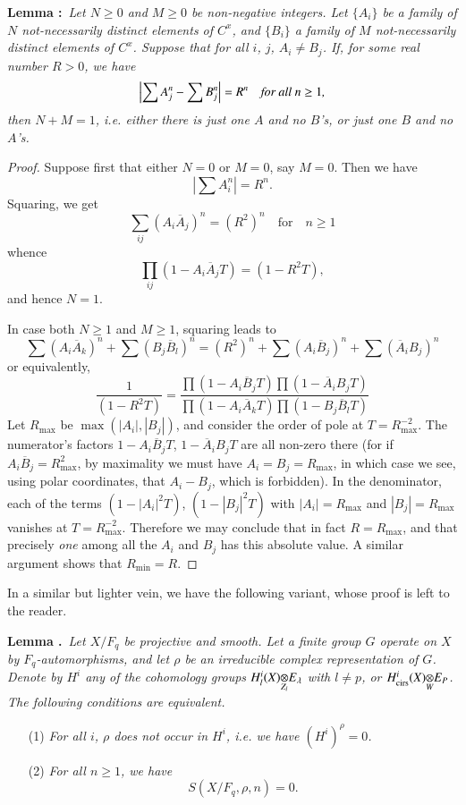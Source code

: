 \medskip
\noindent
{\bfseries Lemma :\label{art6-lem1.2}}~{\em Let $N\geq 0$ and $M\geq 0$ be non-negative integers. Let $\{A_{i}\}$ be a family of $N$ not-necessarily distinct elements of $C^{x}$, and $\{B_{i}\}$ a family of $M$ not-necessarily distinct elements of $C^{x}$. Suppose that for all $i$, $j$, $A_{i}\neq B_{j}$. If, for some real number $R>0$, we have}
$$
\left| \sum A^{n}_{j}-\sum B^{n}_{j}\right|=R^{n}\quad \text{\em for all $n\geq 1$,}
$$
{\em then $N+M=1$, i.e. either there is just one $A$ and no $B$'s, or just one $B$ and no $A$'s.}
\smallskip

\begin{proof}
Suppose first that either $N=0$ or $M=0$, say $M=0$. Then we have
$$
\left| \sum A^{n}_{i}\right|=R^{n}.
$$
Squaring, we get
$$
\sum\limits_{ij}(A_{i}\overline{A}_{j})^{n}=(R^{2})^{n}\quad\text{for}\quad n\geq 1
$$
whence\pageoriginale
$$
\prod\limits_{ij}(1-A_{i}\overline{A}_{j}T)=(1-R^{2}T),
$$
and hence $N=1$.

In case both $N\geq 1$ and $M\geq 1$, squaring leads to
$$
\sum (A_{i}\overline{A}_{k})^{n}+\sum(B_{j}\overline{B}_{l})^{n}=(R^{2})^{n}+\sum(A_{i}\overline{B}_{j})^{n}+\sum (\overline{A}_{i}B_{j})^{n}
$$
or equivalently,
$$
\frac{1}{(1-R^{2}T)}=\frac{\prod (1-A_{i}\overline{B}_{j}T)\prod(1-\overline{A}_{i}B_{j}T)}{\prod(1-A_{i}\overline{A}_{k}T)\prod(1-B_{j}\overline{B}_{l}T)}
$$
Let $R_{\max}$ be $\max (|A_{i}|,|B_{j}|)$, and consider the order of pole at $T=R^{-2}_{\max}$. The numerator's factors $1-A_{i}\overline{B}_{j}T$, $1-\overline{A}_{i}B_{j}T$ are all non-zero there (for if $A_{i}\overline{B}_{j}=R^{2}_{\max}$, by maximality we must have $A_{i}=B_{j}=R_{\max}$, in which case we see, using polar coordinates, that $A_{i}-B_{j}$, which is forbidden). In the denominator, each of the terms $(1-|A_{i}|^{2}T)$, $(1-|B_{j}|^{2}T)$ with $|A_{i}|=R_{\max}$ and $|B_{j}|=R_{\max}$ vanishes at $T=R^{-2}_{\max}$. Therefore we may conclude that in fact $R=R_{\max}$, and that precisely {\em one} among all the $A_{i}$ and $B_{j}$ has this absolute value. A similar argument shows that $R_{\min}=R$.
\end{proof}

In a similar but lighter vein, we have the following variant, whose proof is left to the reader.

\medskip
\noindent
{\bf Lemma .\label{art6-lem1.3}}~{\em Let $X/F_{q}$ be projective and smooth. Let a finite group $G$ operate on $X$ by $F_{q}$-automorphisms, and let $\rho$ be an irreducible complex representation of $G$. Denote by $H^{i}$ any of the cohomology groups $\foprod{H^{i}_{l}(X)}{E_{\lambda}}{Z_{l}}$ with $l\neq p$, or $\foprod{H^{i}_{\text{cirs}}(X)}{E_{P}}{W}$. The following conditions are equivalent.}
\begin{itemize}
\item[(1)] {\em For all $i$, $\rho$ does not occur in $H^{i}$, i.e. we have $(H^{i})^{\rho}=0$.}

\item[(2)] {\em For all $n\geq 1$, we have}
$$
S(X/F_{q},\rho,n)=0.
$$
\end{itemize}


